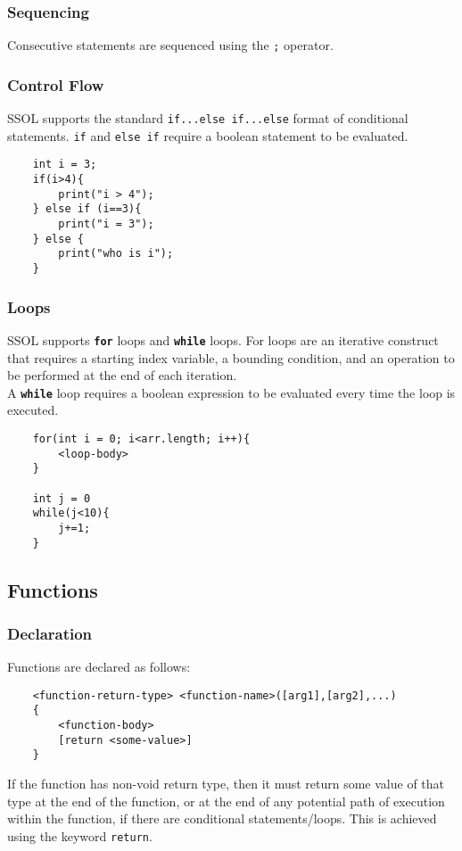 \documentclass{article}
\begin{document}
\subsubsection{Sequencing}
Consecutive statements are sequenced using the \texttt{;} operator.
\subsubsection{Control Flow}
SSOL supports the standard \texttt{if...else if...else} format of conditional statements. 
\texttt{if} and \texttt{else if} require a boolean statement to be evaluated.
\begin{verbatim}
    int i = 3;
    if(i>4){
        print("i > 4");
    } else if (i==3){
        print("i = 3");
    } else {
        print("who is i");
    }
\end{verbatim}
\subsubsection{Loops}
SSOL supports \texttt{\bf for} loops and \texttt{\bf while} loops. For loops are an iterative construct that requires a starting index variable, a bounding condition, and an operation to be performed at the end of each iteration.\\
A \texttt{\bf while} loop requires a boolean expression to be evaluated every time the loop is executed.
\begin{verbatim}
    for(int i = 0; i<arr.length; i++){
        <loop-body>
    }
    
    int j = 0
    while(j<10){
        j+=1;
    }
\end{verbatim}


\subsection{Functions}
\subsubsection{Declaration}
Functions are declared as follows:
\begin{verbatim}
    <function-return-type> <function-name>([arg1],[arg2],...)
    {
        <function-body>
        [return <some-value>]
    }
\end{verbatim}
If the function has non-void return type, then it must return some value of that type at the end of the function, or
at the end of any potential path of execution within the function, if there are conditional statements/loops. This is achieved using the keyword \texttt{return}.
\end{document}

